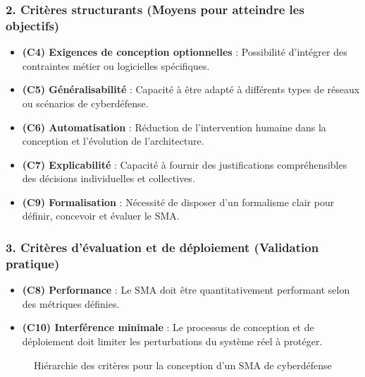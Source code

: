 \documentclass[ twoside,openright,titlepage,numbers=noenddot,headinclude,%
                footinclude=true,cleardoublepage=empty,abstractoff, %
                BCOR=5mm,paper=a4,fontsize=11pt,%
                french,american,%
                ]{scrreprt}
\begin{document}
\subsubsection*{2. Critères structurants (Moyens pour atteindre les objectifs)}

\begin{itemize}
    \item \textbf{(C4) Exigences de conception optionnelles} : Possibilité d'intégrer des contraintes métier ou logicielles spécifiques.
    \item \textbf{(C5) Généralisabilité} : Capacité à être adapté à différents types de réseaux ou scénarios de cyberdéfense.
    \item \textbf{(C6) Automatisation} : Réduction de l'intervention humaine dans la conception et l'évolution de l'architecture.
    \item \textbf{(C7) Explicabilité} : Capacité à fournir des justifications compréhensibles des décisions individuelles et collectives.
    \item \textbf{(C9) Formalisation} : Nécessité de disposer d'un formalisme clair pour définir, concevoir et évaluer le SMA.
\end{itemize}

\subsubsection*{3. Critères d'évaluation et de déploiement (Validation pratique)}

\begin{itemize}
    \item \textbf{(C8) Performance} : Le SMA doit être quantitativement performant selon des métriques définies.
    \item \textbf{(C10) Interférence minimale} : Le processus de conception et de déploiement doit limiter les perturbations du système réel à protéger.
\end{itemize}

\begin{figure}[H]
    \centering
    \caption{Hiérarchie des critères pour la conception d'un SMA de cyberdéfense}
\end{figure}
\end{document}
